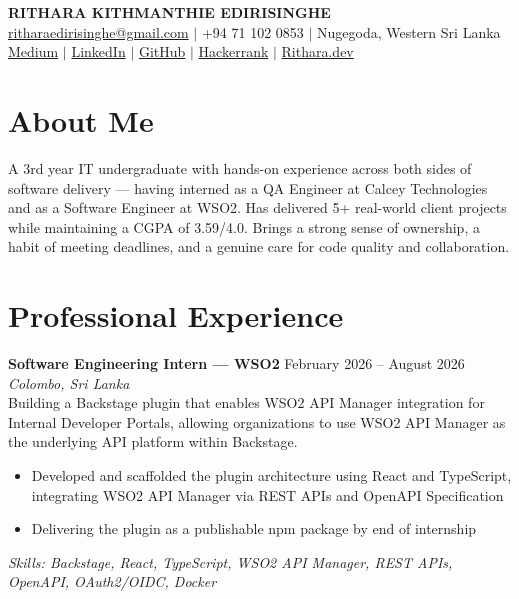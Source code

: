 \documentclass[a4paper,10pt]{article}
\newcommand{\cvitem}[2]{\textbf{#1} \hfill #2 \\[-2pt]}
\begin{document}
\begin{center}
  {\Huge\bfseries\color{accentblue} RITHARA KITHMANTHIE EDIRISINGHE}\\[3pt]
  \small
  \href{mailto:ritharaedirisinghe@gmail.com}{ritharaedirisinghe@gmail.com} $|$
  +94 71 102 0853 $|$
  Nugegoda, Western Sri Lanka \\[1pt]
  \href{https://medium.com/@ritharaedirisinghe}{Medium} $|$
  \href{https://linkedin.com/in/rithara-edirisinghe}{LinkedIn} $|$
  \href{https://github.com/rithakith}{GitHub} $|$
  \href{https://www.hackerrank.com/profile/ritharaedirisin}{Hackerrank} $|$
  \href{https://rithara.dev}{Rithara.dev}
\end{center}

\vspace{1pt}

\section{About Me}
\vspace{2pt}
A 3rd year IT undergraduate with hands-on experience across both sides of software delivery — having interned as a QA Engineer at Calcey Technologies and as a Software Engineer at WSO2. Has delivered 5+ real-world client projects while maintaining a CGPA of 3.59/4.0. Brings a strong sense of ownership, a habit of meeting deadlines, and a genuine care for code quality and collaboration.

\section{Professional Experience}
\vspace{2pt}

\cvitem{Software Engineering Intern --- WSO2}{February 2026 -- August 2026}
\textit{Colombo, Sri Lanka}\\[1pt]
Building a Backstage plugin that enables WSO2 API Manager integration for Internal Developer Portals, allowing organizations to use WSO2 API Manager as the underlying API platform within Backstage.
\begin{itemize}
  \item Developed and scaffolded the plugin architecture using React and TypeScript, integrating WSO2 API Manager via REST APIs and OpenAPI Specification
  \item Delivering the plugin as a publishable npm package by end of internship
\end{itemize}
\textit{\color{accentblue}Skills: Backstage, React, TypeScript, WSO2 API Manager, REST APIs, OpenAPI, OAuth2/OIDC, Docker}
\end{document}
